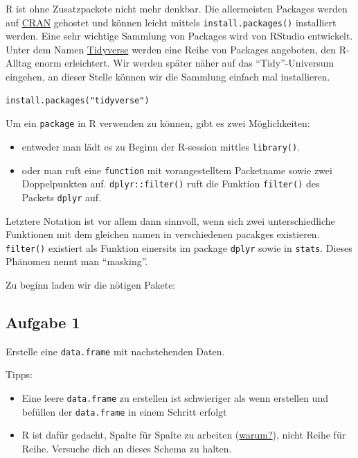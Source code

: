 \documentclass[]{book}
\providecommand{\tightlist}{%
  \setlength{\itemsep}{0pt}\setlength{\parskip}{0pt}}
\begin{document}
R ist ohne Zusatzpackete nicht mehr denkbar. Die allermeisten Packages werden auf \href{https://cran.r-project.org/}{CRAN} gehostet und können leicht mittels \texttt{install.packages()} installiert werden. Eine sehr wichtige Sammlung von Packages wird von RStudio entwickelt. Unter dem Namen \href{https://www.tidyverse.org/}{Tidyverse} werden eine Reihe von Packages angeboten, den R-Alltag enorm erleichtert. Wir werden später näher auf das ``Tidy''-Universum eingehen, an dieser Stelle können wir die Sammlung einfach mal installieren.

\begin{verbatim}
install.packages("tidyverse")
\end{verbatim}

Um ein \texttt{package} in R verwenden zu können, gibt es zwei Möglichkeiten:

\begin{itemize}
\tightlist
\item
  entweder man lädt es zu Beginn der R-session mittles \texttt{library()}.
\item
  oder man ruft eine \texttt{function} mit vorangestelltem Packetname sowie zwei Doppelpunkten auf. \texttt{dplyr::filter()} ruft die Funktion \texttt{filter()} des Packets \texttt{dplyr} auf.
\end{itemize}

Letztere Notation ist vor allem dann sinnvoll, wenn sich zwei unterschiedliche Funktionen mit dem gleichen namen in verschiedenen pacakges existieren. \texttt{filter()} existiert als Funktion einersits im package \texttt{dplyr} sowie in \texttt{stats}. Dieses Phänomen nennt man ``masking''.

Zu beginn laden wir die nötigen Pakete:

\hypertarget{aufgabe-1}{%
\subsection{Aufgabe 1}\label{aufgabe-1}}

Erstelle eine \texttt{data.frame} mit nachstehenden Daten.

Tipps:

\begin{itemize}
\tightlist
\item
  Eine leere \texttt{data.frame} zu erstellen ist schwieriger als wenn erstellen und befüllen der \texttt{data.frame} in einem Schritt erfolgt
\item
  R ist dafür gedacht, Spalte für Spalte zu arbeiten (\href{http://www.noamross.net/blog/2014/4/16/vectorization-in-r--why.html}{warum?}), nicht Reihe für Reihe. Versuche dich an dieses Schema zu halten.
\end{itemize}
\end{document}
